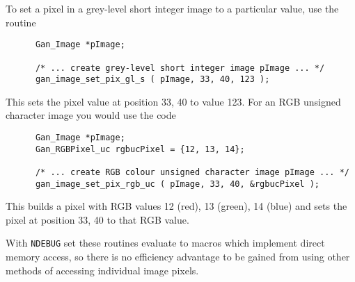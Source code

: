 To set a pixel in a grey-level short integer image to a particular value, use
the routine
\begin{verbatim}
      Gan_Image *pImage;

      /* ... create grey-level short integer image pImage ... */
      gan_image_set_pix_gl_s ( pImage, 33, 40, 123 );
\end{verbatim}
This sets the pixel value at position 33, 40 to value 123. For an RGB unsigned
character image you would use the code
\begin{verbatim}
      Gan_Image *pImage;
      Gan_RGBPixel_uc rgbucPixel = {12, 13, 14};

      /* ... create RGB colour unsigned character image pImage ... */
      gan_image_set_pix_rgb_uc ( pImage, 33, 40, &rgbucPixel );
\end{verbatim}
This builds a pixel with RGB values 12 (red), 13 (green), 14 (blue) and
sets the pixel at position 33, 40 to that RGB value.

With {\tt NDEBUG} set these routines evaluate to macros which implement
direct memory access, so there is no efficiency advantage to be gained
from using other methods of accessing individual image pixels.

